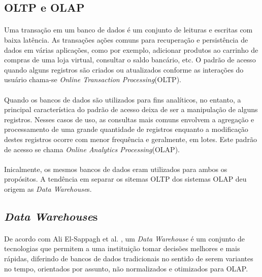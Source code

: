 \subsection{OLTP e OLAP}

\paragraph{} Uma transação em um banco de dados é um conjunto de leituras e escritas com baixa latência. As transações ações comuns para recuperação e persistência de dados em várias aplicações, como por exemplo, adicionar produtos ao carrinho de compras de uma loja virtual, consultar o saldo bancário, etc. 
O padrão de acesso quando alguns registros são criados ou atualizados conforme as interações do usuário chama-se \textit{Online Transaction Processing}(OLTP).

\paragraph{} Quando os bancos de dados são utilizados para fins analíticos, no entanto, a principal característica do padrão de acesso deixa de ser a manipulação
de alguns registros. Nesses casos de uso, as consultas mais comuns envolvem a agregação e processamento de uma grande quantidade de registros enquanto a 
modificação destes registros ocorre com menor frequência e geralmente, em lotes. Este padrão de acesso se chama \textit{Online Analytics Processing}(OLAP).

\paragraph{} Inicalmente, os mesmos bancos de dados eram utilizados para ambos os propósitos. A tendência em separar os sitemas OLTP dos sistemas OLAP deu origem as \textit{Data Warehouse}s.\cite{kleppmann2017designing}

\subsection{\textit{Data Warehouse}s}

\paragraph{} De acordo com Ali El-Sappagh et al. \cite{el2011proposed}, um \textit{Data Warehouse} é um conjunto de tecnologias que permitem a uma instituição tomar decisões melhores e mais rápidas, diferindo de bancos de dados tradicionais no sentido de serem variantes no tempo, orientados por assunto, não normalizados e otimizados para OLAP.


